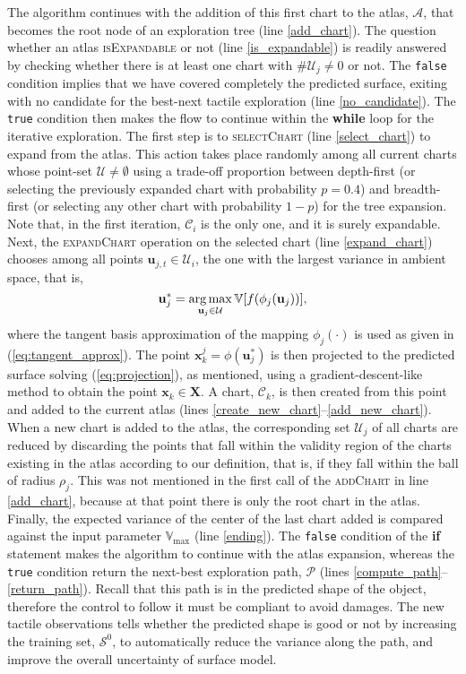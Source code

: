 The algorithm continues with the addition of this first chart to the atlas, $\mathcal{A}$, that becomes the root node of an exploration tree (line \ref{add_chart}). The question whether an atlas \textsc{isExpandable} or not (line \ref{is_expandable}) is readily answered by checking whether there is at least one chart with $\#\mathcal{U}_j \neq 0$ or not. The \texttt{false} condition implies that we have covered completely the predicted surface, exiting with no candidate for the best-next tactile exploration (line \ref{no_candidate}). The \texttt{true} condition then makes the flow to continue within the \textbf{while} loop for the iterative exploration. The first step is to \textsc{selectChart} (line \ref{select_chart}) to expand from the atlas. This action takes place randomly among all current charts whose point-set $\mathcal{U} \neq \emptyset$ using a trade-off proportion between depth-first (or selecting the previously expanded chart with probability $p = 0.4$) and breadth-first (or selecting any other chart with probability $1-p$) for the tree expansion. Note that, in the first iteration, $\mathcal{C}_i$ is the only one, and it is surely expandable. Next, the \textsc{expandChart} operation on the selected chart (line \ref{expand_chart}) chooses among all points $\mathbf{u}_{j,t} \in \mathcal{U}_i$, the one with the largest variance in ambient space, that is,
\begin{equation}
\mathbf{u}_{j}^* =  \operatorname*{arg\,max}_{\mathbf{u}_{j} \in \mathcal{U}} \mathbb{V}[f(\phi_j(\mathbf{u}_{j}))], 
\end{equation}
where the tangent basis approximation of the mapping $\phi_j(\cdot)$ is used as given in (\ref{eq:tangent_approx}). The point $\mathbf{x}_k^j = \phi(\mathbf{u}_{j}^*)$ is then projected to the predicted surface solving (\ref{eq:projection}), as mentioned, using a gradient-descent-like method to obtain the point $\mathbf{x}_k \in \mathbf{X}$. A chart, $\mathcal{C}_k$, is then created from this point and added to the current atlas (lines \ref{create_new_chart}--\ref{add_new_chart}). When a new chart is added to the atlas, the corresponding set $\mathcal{U}_j$ of all charts are reduced by discarding the points that fall within the validity region of the charts existing in the atlas according to our definition, that is, if they fall within the ball of radius $\rho_j$. This was not mentioned in the first call of the \textsc{addChart} in line \ref{add_chart}, because at that point there is only the root chart in the atlas. Finally, the expected variance of the center of the last chart added is compared against the input parameter $\mathbb{V}_{\max}$ (line \ref{ending}). The \texttt{false} condition of the \textbf{if} statement makes the algorithm to continue with the atlas expansion, whereas the \texttt{true} condition return the next-best exploration path, $\mathcal{P}$ (lines \ref{compute_path}--\ref{return_path}). Recall that this path is in the predicted shape of the object, therefore the control to follow it must be compliant to avoid damages. The new tactile observations tells whether the predicted shape is good or not by increasing the training set, $\mathcal{S}^0$, to automatically reduce the variance along the path, and improve the overall uncertainty of surface model.
